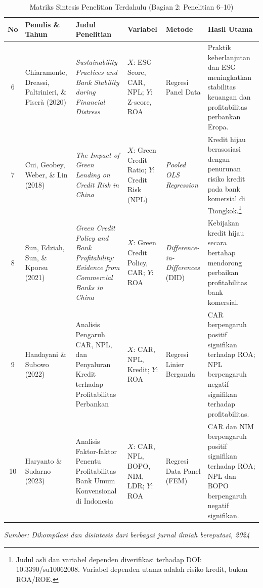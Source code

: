 \documentclass[12pt,a4paper]{article}
\numberwithin{equation}{section}
\begin{document}
\begin{table}[H]
  \caption{Matriks Sintesis Penelitian Terdahulu (Bagian 2: Penelitian 6--10)}
  \label{tab:penelitian_terdahulu_b}
  \footnotesize
  \begin{tabularx}{\textwidth}{|c|>{\raggedright\arraybackslash}p{2.3cm}|>{\raggedright\arraybackslash}X|>{\raggedright\arraybackslash}p{1.9cm}|>{\raggedright\arraybackslash}p{1.8cm}|>{\raggedright\arraybackslash}X|}
    \hline
    \textbf{No} & \textbf{Penulis \& Tahun} & \textbf{Judul Penelitian} & \textbf{Variabel} & \textbf{Metode} & \textbf{Hasil Utama} \\
    \hline
    6 & Chiaramonte, Dreassi, Paltrinieri, \& Piser\`a (2020) & \emph{Sustainability Practices and Bank Stability during Financial Distress} & $X$: ESG Score, CAR, NPL; $Y$: Z-score, ROA & Regresi Panel Data & Praktik keberlanjutan dan ESG meningkatkan stabilitas keuangan dan profitabilitas perbankan Eropa. \\
    \hline
    7 & Cui, Geobey, Weber, \& Lin (2018) & \emph{The Impact of Green Lending on Credit Risk in China} & $X$: Green Credit Ratio; $Y$: Credit Risk (NPL) & \emph{Pooled OLS Regression} & Kredit hijau berasosiasi dengan penurunan risiko kredit pada bank komersial di Tiongkok.\footnote{Judul asli dan variabel dependen diverifikasi terhadap DOI: 10.3390/su10062008. Variabel dependen utama adalah risiko kredit, bukan ROA/ROE.} \\
    \hline
    8 & Sun, Edziah, Sun, \& Kporsu (2021) & \emph{Green Credit Policy and Bank Profitability: Evidence from Commercial Banks in China} & $X$: Green Credit Policy, CAR; $Y$: ROA & \emph{Difference-in-Differences} (DID) & Kebijakan kredit hijau secara bertahap mendorong perbaikan profitabilitas bank komersial. \\
    \hline
    9 & Handayani \& Subowo (2022) & Analisis Pengaruh CAR, NPL, dan Penyaluran Kredit terhadap Profitabilitas Perbankan & $X$: CAR, NPL, Kredit; $Y$: ROA & Regresi Linier Berganda & CAR berpengaruh positif signifikan terhadap ROA; NPL berpengaruh negatif signifikan terhadap profitabilitas. \\
    \hline
    10 & Haryanto \& Sudarno (2023) & Analisis Faktor-faktor Penentu Profitabilitas Bank Umum Konvensional di Indonesia & $X$: CAR, NPL, BOPO, NIM, LDR; $Y$: ROA & Regresi Data Panel (FEM) & CAR dan NIM berpengaruh positif signifikan terhadap ROA; NPL dan BOPO berpengaruh negatif signifikan. \\
    \hline
  \end{tabularx}
  \begin{flushleft}
    \textit{Sumber: Dikompilasi dan disintesis dari berbagai jurnal ilmiah bereputasi, 2024}
  \end{flushleft}
\end{table}
\end{document}
